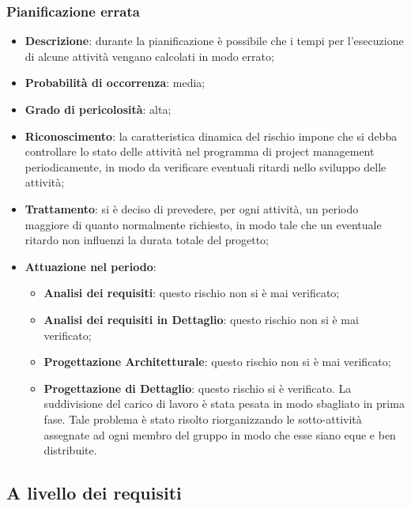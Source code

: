 		\subsubsection{Pianificazione errata}
		\begin{itemize}
			\item \textbf{Descrizione}: durante la pianificazione è possibile che i tempi per l'esecuzione di alcune attività vengano calcolati in modo errato;
			\item \textbf{Probabilità di occorrenza}: media;
			\item \textbf{Grado di pericolosità}: alta;
			\item \textbf{Riconoscimento}: la caratteristica dinamica del rischio impone che si debba controllare lo stato delle attività nel programma di project management periodicamente, in modo da verificare eventuali ritardi nello sviluppo delle attività;	
			\item \textbf{Trattamento}: si è deciso di prevedere, per ogni attività, un periodo maggiore di quanto normalmente richiesto, in modo tale che un eventuale ritardo non influenzi la durata totale del progetto;
			\item \textbf{Attuazione nel periodo}:
			\begin{itemize}
				\item \textbf{Analisi dei requisiti}: questo rischio non si è mai verificato;
				\item \textbf{Analisi dei requisiti in Dettaglio}: questo rischio non si è mai verificato;
				\item \textbf{Progettazione Architetturale}: questo rischio non si è mai verificato;
				\item \textbf{Progettazione di Dettaglio}: questo rischio si è verificato. La suddivisione del carico di lavoro è stata pesata in modo sbagliato in prima fase. Tale problema è stato risolto riorganizzando le sotto-attività assegnate ad ogni membro del gruppo in modo che esse siano eque e ben distribuite.  
			\end{itemize}
		\end{itemize}
	
	\subsection{A livello dei requisiti}
	
